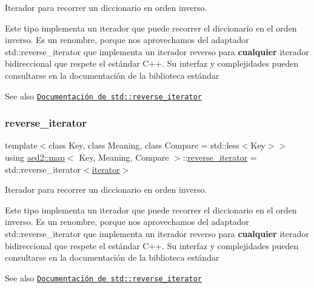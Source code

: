 Iterador para recorrer un diccionario en orden inverso. 

Este tipo implementa un iterador que puede recorrer el diccionario en el orden inverso. Es un renombre, porque nos aprovechamos del adaptador {\ttfamily std\+::reverse\+\_\+iterator} que implementa un iterador reverso para {\bfseries cualquier} iterador bidireccional que respete el estándar C++. Su interfaz y complejidades pueden consultarse en la documentación de la biblioteca estándar

\begin{DoxySeeAlso}{See also}
\href{http://en.cppreference.com/w/cpp/iterator/reverse_iterator}{\tt Documentación de {\ttfamily std\+::reverse\+\_\+iterator}} 
\end{DoxySeeAlso}
\mbox{\label{classaed2_1_1map_a8e6a592062260177fd73b2f9897b1dd5}} 
\subsubsection{\texorpdfstring{reverse\+\_\+iterator}{reverse\_iterator}\hspace{0.1cm}{\footnotesize\ttfamily [2/2]}}
{\footnotesize\ttfamily template$<$class Key, class Meaning, class Compare = std\+::less$<$\+Key$>$$>$ \\
using \hyperlink{classaed2_1_1map}{aed2\+::map}$<$ Key, Meaning, Compare $>$\+::\hyperlink{classaed2_1_1map_a8e6a592062260177fd73b2f9897b1dd5}{reverse\+\_\+iterator} =  std\+::reverse\+\_\+iterator$<$\hyperlink{classaed2_1_1map_1_1iterator}{iterator}$>$}



Iterador para recorrer un diccionario en orden inverso. 

Este tipo implementa un iterador que puede recorrer el diccionario en el orden inverso. Es un renombre, porque nos aprovechamos del adaptador {\ttfamily std\+::reverse\+\_\+iterator} que implementa un iterador reverso para {\bfseries cualquier} iterador bidireccional que respete el estándar C++. Su interfaz y complejidades pueden consultarse en la documentación de la biblioteca estándar

\begin{DoxySeeAlso}{See also}
\href{http://en.cppreference.com/w/cpp/iterator/reverse_iterator}{\tt Documentación de {\ttfamily std\+::reverse\+\_\+iterator}} 
\end{DoxySeeAlso}



